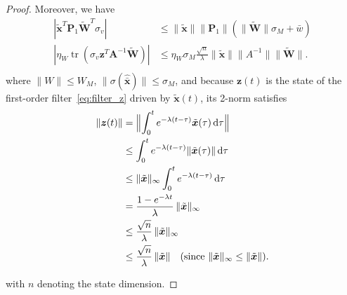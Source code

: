 \documentclass[11pt, a4paper]{article}
\newcommand{\tr}{\operatorname{tr}}
\newcommand{\xtilde}{\tilde{\bm{x}}}
\newcommand{\xhatbar}{\hat{\bar{\bm{x}}}}
\newcommand{\Wtilde}{\tilde{\mathbf{W}}}
\begin{document}
\begin{proof}
Moreover, we have
\begin{align*}
    |\xtilde^T\mathbf{P}_1 \Wtilde^T \sigma_v| &\le \|\xtilde\|\|\mathbf{P}_1\|(\|\Wtilde\| \sigma_{M} + \bar{w})\\
        |\eta_W \tr(\sigma_v \bm{z}^T\mathbf{A}^{-1}\Wtilde)|
    &\le \eta_W \sigma_M \frac{\sqrt{n}}{\lambda} \|\xtilde\| \|A^{-1}\| \|\Wtilde\|. \\
\end{align*}
where $\|W\|\le W_M$, $\|\sigma(\xhatbar)\|\le \sigma_M$, and
because $\bm z(t)$ is the state of the first-order filter~\eqref{eq:filter_z}
driven by $\xtilde(t)$, its 2-norm satisfies
\begin{align}
    \|\bm z(t)\|
    &= \Bigl\| \int_{0}^{t} e^{-\lambda(t-\tau)} \xtilde(\tau)\,\mathrm d\tau \Bigr\| \notag\\
    &\le \int_{0}^{t} e^{-\lambda(t-\tau)} \|\xtilde(\tau)\|\,\mathrm d\tau \notag\\
    &\le \|\xtilde\|_{\infty} \int_{0}^{t} e^{-\lambda(t-\tau)}\,\mathrm d\tau \notag\\
    &= \frac{1-e^{-\lambda t}}{\lambda}\,\|\xtilde\|_{\infty} \notag\\
    &\le \frac{\sqrt{n}}{\lambda}\,\|\xtilde\|_{\infty} \notag\\
    &\le \frac{\sqrt{n}}{\lambda}\,\|\xtilde\| \quad (\text{since } \|\xtilde\|_{\infty}\le\|\xtilde\|).
\end{align}


with $n$ denoting the state dimension.



\end{proof}
\end{document}
